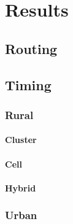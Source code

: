\documentclass[master,english]{hgbthesis}
\begin{document}






\chapter{Results}

\section{Routing}

\section{Timing}

\subsection{Rural}

\subsubsection{Cluster}

\subsubsection{Cell}

\subsubsection{Hybrid}

\subsection{Urban}
\end{document}
